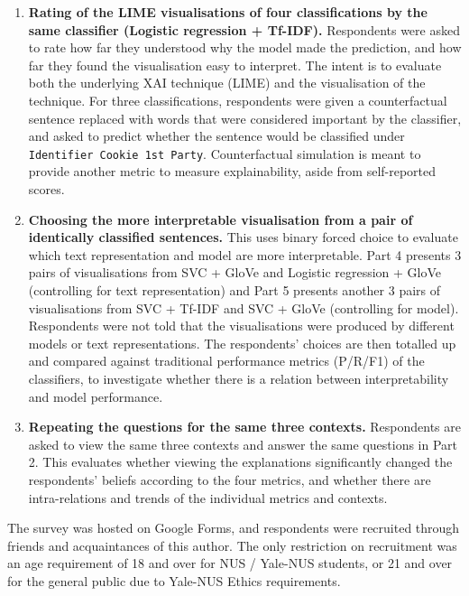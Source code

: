 \begin{enumerate}
	\item \textbf{Rating of the LIME visualisations of four classifications by the same classifier (Logistic regression + Tf-IDF).} Respondents were asked to rate how far they understood why the model made the prediction, and how far they found the visualisation easy to interpret. The intent is to evaluate both the underlying XAI technique (LIME) and the visualisation of the technique. For three classifications, respondents were given a counterfactual sentence replaced with words that were considered important by the classifier, and asked to predict whether the sentence would be classified under \texttt{Identifier Cookie 1st Party}. Counterfactual simulation is meant to provide another metric to measure explainability, aside from self-reported scores.
	\item \textbf{Choosing the more interpretable visualisation from a pair of identically classified sentences.} This uses binary forced choice to evaluate which text representation and model are more interpretable. Part 4 presents 3 pairs of visualisations from SVC + GloVe and Logistic regression + GloVe (controlling for text representation) and Part 5 presents another 3 pairs of visualisations from SVC + Tf-IDF and SVC + GloVe (controlling for model). Respondents were not told that the visualisations were produced by different models or text representations. The respondents' choices are then totalled up and compared against traditional performance metrics (P/R/F1) of the classifiers, to investigate whether there is a relation between interpretability and model performance.
	\item \textbf{Repeating the questions for the same three contexts.} Respondents are asked to view the same three contexts and answer the same questions in Part 2. This evaluates whether viewing the explanations significantly changed the respondents' beliefs according to the four metrics, and whether there are intra-relations and trends of the individual metrics and contexts.
\end{enumerate}

The survey was hosted on Google Forms, and respondents were recruited through friends and acquaintances of this author. The only restriction on recruitment was an age requirement of 18 and over for NUS / Yale-NUS students, or 21 and over for the general public due to Yale-NUS Ethics requirements.